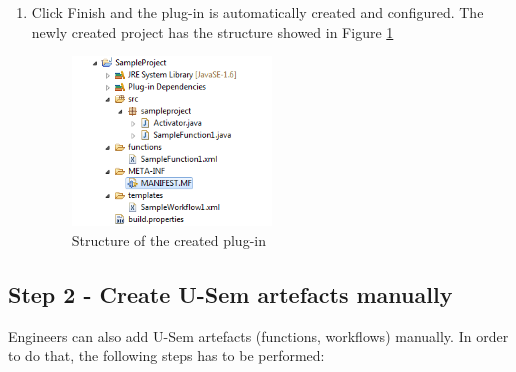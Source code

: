 \begin{enumerate}
		\item Click Finish and the plug-in is automatically created and configured. The newly created project has the structure showed in Figure \ref{struct}
		
\begin{figure}
  \centering
    \includegraphics[width=0.5\textwidth]{apendix/PluginTutorial/fileStruct.png}
    \caption{Structure of the created plug-in}
    \label{struct}
\end{figure}

	\end{enumerate}

\subsection{Step 2 - Create U-Sem artefacts manually}
Engineers can also add U-Sem artefacts (functions, workflows) manually. In order to do that, the following steps has to be performed:

